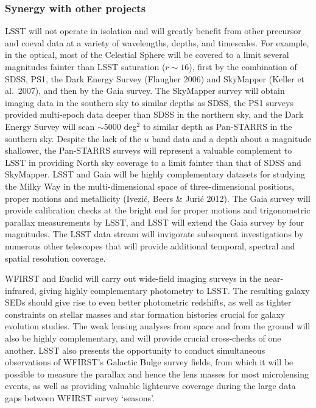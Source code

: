 \documentclass{emulateapj}
\begin{document}
\subsubsection{  Synergy with other projects }

LSST will not operate in isolation and will greatly benefit from other precursor and coeval 
data at a variety of wavelengths, depths, and timescales. For example,
in the optical, most of the Celestial 
Sphere will be covered to a limit several magnitudes fainter than LSST saturation 
($r\sim16$), first by the combination of SDSS, PS1, the Dark Energy Survey (Flaugher 2006) and SkyMapper (Keller et al.~2007), 
and then by the Gaia survey. The SkyMapper survey will obtain imaging data in the southern
sky to similar depths as SDSS, the PS1 surveys provided multi-epoch data deeper 
than SDSS in the northern sky, and the Dark Energy Survey will scan 
$\sim$5000 deg$^2$ to similar depth as Pan-STARRS in the southern sky. Despite the lack of 
the $u$ band data and a depth about a magnitude shallower, the Pan-STARRS surveys
will represent a valuable complement to LSST in providing North sky coverage to a limit 
fainter than that of SDSS and SkyMapper. LSST and Gaia will 
be highly complementary datasets for studying the Milky Way in the multi-dimensional space of 
three-dimensional positions, proper motions and metallicity (Ivezi\'{c}, Beers \& Juri\'{c} 2012). 
The Gaia survey will provide calibration checks at the bright end for proper 
motions and trigonometric parallax measurements by LSST, and LSST will extend the 
Gaia survey by four magnitudes. The LSST data stream will invigorate subsequent 
investigations by numerous other telescopes that will provide 
additional temporal, spectral and spatial resolution coverage. 

WFIRST and Euclid will carry out wide-field imaging surveys in the
near-infrared, giving highly complementary photometry to LSST.  The
resulting galaxy SEDs should give rise to even better photometric
redshifts, as well as tighter constraints on stellar masses and star
formation histories crucial for galaxy evolution studies.  The weak
lensing analyses from space and from the ground will also be highly
complementary, and will provide crucial cross-checks of one another.  
LSST also presents the opportunity to conduct simultaneous observations of WFIRST's Galactic Bulge survey fields, from which it will be possible to measure the parallax and hence the lens masses for most microlensing events, as well as providing valuable lightcurve coverage during the large data gaps between WFIRST survey `seasons'.  
\end{document}
